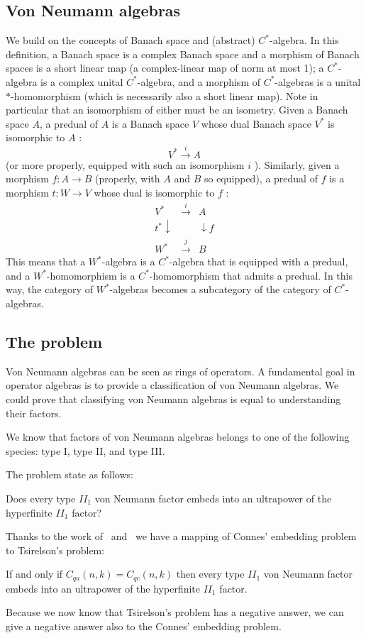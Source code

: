 
\subsection{Von Neumann algebras}
We build on the concepts of Banach space and (abstract) $C^{*}$-algebra. In this definition, a Banach space is a complex Banach space and a morphism of Banach spaces is a short linear map (a complex-linear map of norm at most 1); a $C^{*}$-algebra is a complex unital $C^{*}$-algebra, and a morphism of $C^{*}$-algebras is a unital $*$-homomorphism (which is necessarily also a short linear map). Note in particular that an isomorphism of either must be an isometry.
Given a Banach space $A$, a predual of $A$ is a Banach space $V$ whose dual Banach space $V^{*}$ is isomorphic to $A$ :
$$
V^{*} \stackrel{i}{\rightarrow} A
$$
(or more properly, equipped with such an isomorphism $i$ ). Similarly, given a morphism $f: A \rightarrow B$ (properly, with $A$ and $B$ so equipped), a predual of $f$ is a morphism $t: W \rightarrow V$ whose dual is isomorphic to $f$ :
$$
\begin{array}{ccc}
V^{*} & \stackrel{i}{\rightarrow} & A \\
t^{*} \downarrow & & \downarrow f \\
W^{*} & \stackrel{j}\rightarrow & B
\end{array}
$$
This means that a $W^{*}$-algebra is a $C^{*}$-algebra that is equipped with a predual, and a $W^{*}$-homomorphism is a $C^{*}$-homomorphism that admits a predual. In this way, the category of $W^{*}$-algebras becomes a subcategory of the category of $C^{*}$-algebras.


\subsection{The problem}

Von Neumann algebras can be seen as rings of operators. A fundamental goal in operator algebras is to provide a classification of von Neumann algebras. We could prove that classifying von Neumann algebras is equal to understanding their factors.

We know that factors of von Neumann algebras belongs to one of the following species: type I, type II, and type III. 

The problem state as follows:

\begin{problem}
    Does every type $II_1$ von Neumann factor embeds into an ultrapower of the hyperfinite $II_1$ factor?~\cite{mipre}
\end{problem}

Thanks to the work of~\cite{Tsirelson_1} and~\cite{Tsirelson_2} we have a mapping of Connes' embedding problem to Tsirelson's problem:

\begin{theorem}
If and only if $C_{q a}(n, k) = C_{q c}(n, k)$ then every type $II_1$ von Neumann factor embeds into an ultrapower of the hyperfinite $II_1$ factor.~\cite{mipre}
\end{theorem}

Because we now know that Tsirelson's problem has a negative answer, we can give a negative answer also to the Connes' embedding problem.


